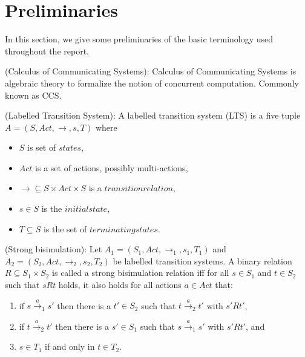 \section{Preliminaries}

In this section, we give some preliminaries of the basic terminology used throughout the report.

\begin{definition}
(Calculus of Communicating Systems): Calculus of Communicating Systems is algebraic theory to formalize the notion of concurrent computation. Commonly known as CCS.
\end{definition}

\begin{definition}
(Labelled Transition System): A labelled transition system (LTS) is a five tuple $A=\left(S, Act, \rightarrow, s, T \right)$ where
\begin{itemize}
	\item $S$ is set of $states$,
	\item $Act$ is a set of actions, possibly multi-actions,
	\item $\rightarrow \subseteq S \times Act \times S$ is a $transition relation$,
	\item $s \in S$ is the $initial state$,
	\item $T \subseteq S$ is the set of $terminating states$.	
\end{itemize}
\end{definition}

\begin{definition}
(Strong bisimulation): Let $A_{1}=\left(S_{1}, Act, \rightarrow_{1}, s_{1}, T_{1}\right)$ and $A_{2}=\left(S_{2}, Act, \rightarrow_{2}, s_{2}, T_{2}\right)$ be labelled transition systems. A binary relation $R \subseteq S_{1} \times S_{2}$ is called a strong bisimulation relation iff for all $s \in S_{1}$ and $t \in S_{2}$ such that $sRt$ holds, it also holds for all actions $a \in Act$ that:
\end{definition}

\begin{definition}
\begin{enumerate}
\item if $s\stackrel{a}{\rightarrow}_{1}s'$ then there is a $t' \in S_{2}$ such that $t\stackrel{a}{\rightarrow}_{2}t'$ with $s'Rt'$,
\item if $t\stackrel{a}{\rightarrow}_{2}t'$ then there is a $s' \in S_{1}$ such that $s\stackrel{a}{\rightarrow}_{1}s'$ with $s'Rt'$, and
\item $s \in T_{1}$ if and only in $t \in T_{2}$.
\end{enumerate}
\end{definition}


